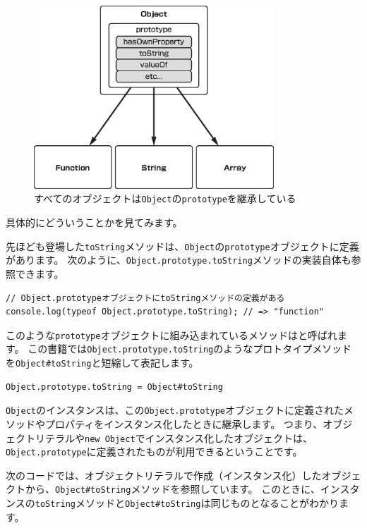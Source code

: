 \begin{figure}
\centering
\includegraphics[width=90mm]{./fig/object-prototype.eps}
\caption{すべてのオブジェクトは\texttt{Object}の\texttt{prototype}を継承している}
\end{figure}

具体的にどういうことかを見てみます。

先ほども登場した\texttt{toString}メソッドは、\texttt{Object}の\texttt{prototype}オブジェクトに定義があります。
次のように、\texttt{Object.prototype.toString}メソッドの実装自体も参照できます。

\begin{lstlisting}
// Object.prototypeオブジェクトにtoStringメソッドの定義がある
console.log(typeof Object.prototype.toString); // => "function"
\end{lstlisting}

このような\texttt{prototype}オブジェクトに組み込まれているメソッドは\textbf{}と呼ばれます。
この書籍では\texttt{Object.prototype.toString}のようなプロトタイプメソッドを\texttt{Object\#toString}と短縮して表記します。

\begin{lstlisting}
Object.prototype.toString = Object#toString
\end{lstlisting}

\texttt{Object}のインスタンスは、この\texttt{Object.prototype}オブジェクトに定義されたメソッドやプロパティをインスタンス化したときに継承します。
つまり、オブジェクトリテラルや\texttt{new Object}でインスタンス化したオブジェクトは、\texttt{Object.prototype}に定義されたものが利用できるということです。

次のコードでは、オブジェクトリテラルで作成（インスタンス化）したオブジェクトから、\texttt{Object\#toString}メソッドを参照しています。
このときに、インスタンスの\texttt{toString}メソッドと\texttt{Object\#toString}は同じものとなることがわかります。

